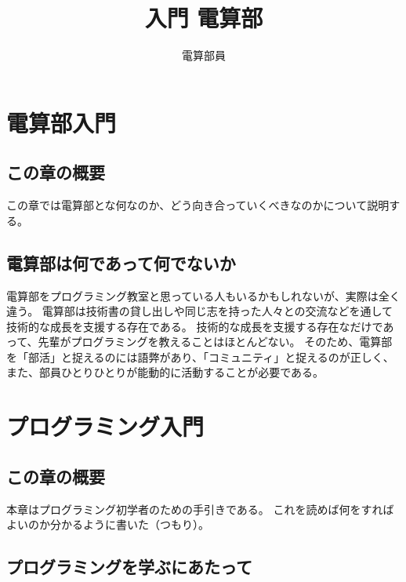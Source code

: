 \documentclass[lualatex,ja=standard,12pt,a4j]{bxjsbook}
\title{入門 電算部}
\author{電算部員}
\begin{document}
	\tableofcontents
	\chapter{電算部入門}
		\section{この章の概要}
			この章では電算部とな何なのか、どう向き合っていくべきなのかについて説明する。
		\section{電算部は何であって何でないか}
			電算部をプログラミング教室と思っている人もいるかもしれないが、実際は全く違う。
			電算部は技術書の貸し出しや同じ志を持った人々との交流などを通して技術的な成長を支援する存在である。
			技術的な成長を支援する存在なだけであって、先輩がプログラミングを教えることはほとんどない。
			そのため、電算部を「部活」と捉えるのには語弊があり、「コミュニティ」と捉えるのが正しく、
			また、部員ひとりひとりが能動的に活動することが必要である。
	\chapter{プログラミング入門}
		\section{この章の概要}
                本章はプログラミング初学者のための手引きである。
                これを読めば何をすればよいのか分かるように書いた（つもり）。
                
		\section{プログラミングを学ぶにあたって}
\end{document}
